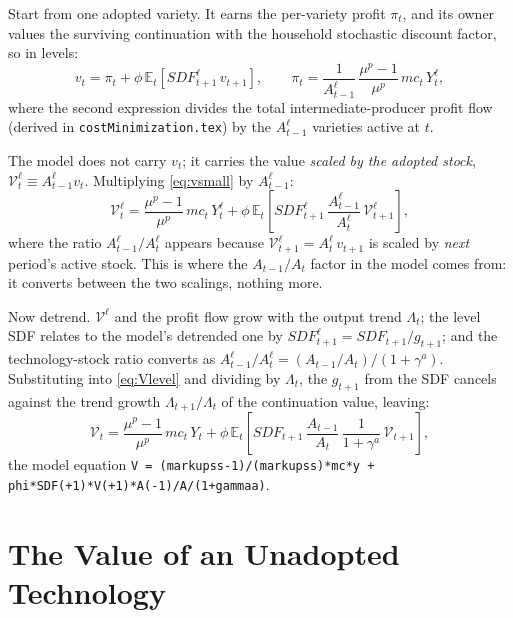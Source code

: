 \documentclass[11pt]{article}
\begin{document}
Start from one adopted variety. It earns the per-variety profit $\pi_t$, and its
owner values the surviving continuation with the household stochastic discount
factor, so in levels:
\begin{equation}\label{eq:vsmall}
    v_t = \pi_t + \phi\,\mathbb{E}_t\!\left[\mathit{SDF}^{\ell}_{t+1}\,
    v_{t+1}\right],
    \qquad
    \pi_t = \frac{1}{A^{\ell}_{t-1}}\,\frac{\mu^{p}-1}{\mu^{p}}\,mc_t\,Y^{\ell}_t,
\end{equation}
where the second expression divides the total intermediate-producer profit flow
(derived in \texttt{costMinimization.tex}) by the $A^{\ell}_{t-1}$ varieties
active at $t$.

The model does not carry $v_t$; it carries the value \emph{scaled by the adopted
stock}, $\mathcal{V}^{\ell}_t \equiv A^{\ell}_{t-1} v_t$. Multiplying
\eqref{eq:vsmall} by $A^{\ell}_{t-1}$:
\begin{equation}\label{eq:Vlevel}
    \mathcal{V}^{\ell}_t = \frac{\mu^{p}-1}{\mu^{p}}\,mc_t\,Y^{\ell}_t
    + \phi\,\mathbb{E}_t\!\left[\mathit{SDF}^{\ell}_{t+1}\,
    \frac{A^{\ell}_{t-1}}{A^{\ell}_{t}}\,\mathcal{V}^{\ell}_{t+1}\right],
\end{equation}
where the ratio $A^{\ell}_{t-1}/A^{\ell}_{t}$ appears because
$\mathcal{V}^{\ell}_{t+1} = A^{\ell}_{t}\,v_{t+1}$ is scaled by \emph{next}
period's active stock. This is where the $A_{t-1}/A_t$ factor in the model comes
from: it converts between the two scalings, nothing more.

Now detrend. $\mathcal{V}^{\ell}$ and the profit flow grow with the output trend
$\Lambda_t$; the level SDF relates to the model's detrended one by
$\mathit{SDF}^{\ell}_{t+1} = \mathit{SDF}_{t+1}/g_{t+1}$; and the technology-stock
ratio converts as $A^{\ell}_{t-1}/A^{\ell}_t =
(A_{t-1}/A_t)/(1+\gamma^{a})$. Substituting into \eqref{eq:Vlevel} and dividing by
$\Lambda_t$, the $g_{t+1}$ from the SDF cancels against the trend growth
$\Lambda_{t+1}/\Lambda_t$ of the continuation value, leaving:
\begin{equation}\label{eq:V}
    \mathcal{V}_t = \frac{\mu^{p}-1}{\mu^{p}}\,mc_t\,Y_t
    + \phi\,\mathbb{E}_t\!\left[\mathit{SDF}_{t+1}\,
    \frac{A_{t-1}}{A_{t}}\,\frac{1}{1+\gamma^{a}}\,\mathcal{V}_{t+1}\right],
\end{equation}
the model equation \texttt{V = (markupss-1)/(markupss)*mc*y +
phi*SDF(+1)*V(+1)*A(-1)/A/(1+gammaa)}.

\section{The Value of an Unadopted Technology}
\end{document}
